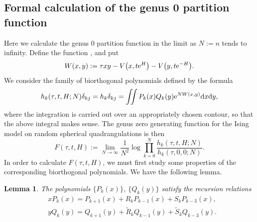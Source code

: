 \documentclass[pdftex]{sigma}
\numberwithin{equation}{section}
\newtheorem{Lemma}[Theorem]{Lemma}
\begin{document}
\subsection[Formal calculation of the genus 0 partition function]{Formal calculation of the genus $\boldsymbol{0}$ partition function} \label{Genus0-B}
Here we calculate the genus $0$ partition function in the limit as $N:=n$ tends to infinity.
Define the function , and put
 \begin{equation*}
 W(x,y) := \tau xy - V\bigl(x,t{\rm e}^{H}\bigr) - V\bigl(y,t{\rm e}^{-H}\bigr).
 \end{equation*}
We consider the family of biorthogonal polynomials defined by the formula
 \begin{equation*}
 h_k(\tau,t,H;N)\delta_{kj} = h_k\delta_{kj} = \iint P_k(x) Q_k(y) {\rm e}^{NW(x,y)} {\rm d}x{\rm d}y,
 \end{equation*}
where the integration is carried out over an appropriately chosen contour, so that the above integral makes sense. The genus zero generating function for
the Ising model on random spherical quadrangulations is then
 \begin{equation*}
 F(\tau,t,H) := \lim_{N \to \infty} \frac{1}{N^2} \log \prod_{k=0}^N \frac{h_k(\tau,t,H;N)}{h_k(\tau,0,0;N)}.
 \end{equation*}
In order to calculate $F(\tau,t,H)$, we must first study some properties of the corresponding biorthogonal polynomials. We have the following lemma.
\begin{Lemma}
 The polynomials $\{P_k(x)\}$, $\{Q_k(y)\}$ satisfy the recursion relations
 \begin{align}
 &xP_k(x)= P_{k+1}(x) + R_k P_{k-1}(x) + S_k P_{k-3}(x), \label{A}\\
 &yQ_k(y)= Q_{k+1}(y) + \tilde{R}_k Q_{k-1}(y) + \tilde{S}_k Q_{k-3}(y).\label{B}
 \end{align}
\end{Lemma}
\end{document}
